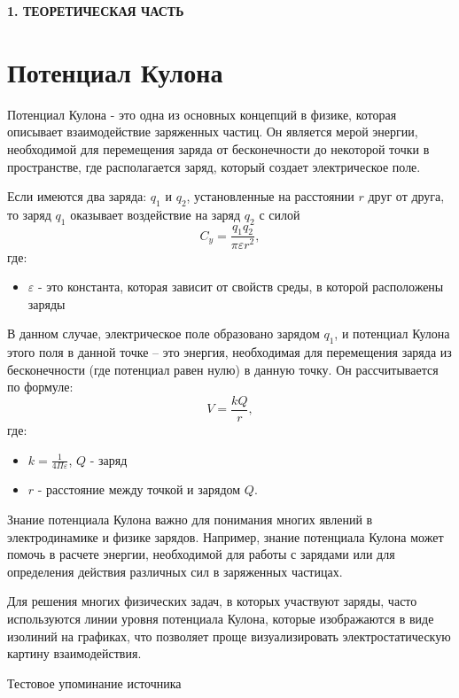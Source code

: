 \newpage
\begin{center}
  \textbf{\large 1. ТЕОРЕТИЧЕСКАЯ ЧАСТЬ}
\end{center}


\section{Потенциал Кулона}

Потенциал Кулона - это одна из основных концепций в физике, которая описывает взаимодействие заряженных частиц. Он является мерой энергии, необходимой для перемещения заряда от бесконечности до некоторой точки в пространстве, где располагается заряд, который создает электрическое поле.

Если имеются два заряда:  $q_1$ и $q_2$, установленные на расстоянии $r$ друг от друга, то заряд $q_1$ оказывает воздействие на заряд $q_2$ с силой 
\[ C_y= \frac{q_1 q_2}{\pi \varepsilon r^2}, \] 
где:
\begin{itemize}
	\item $\varepsilon$ - это константа, которая зависит от свойств среды, в которой расположены заряды
\end{itemize}

В данном случае, электрическое поле образовано зарядом $q_1$, и потенциал Кулона этого поля в данной точке – это энергия, необходимая для перемещения заряда из бесконечности (где потенциал равен нулю) в данную точку. Он рассчитывается по формуле: 
\[ V = \frac{k Q}{r}, \]
где:
\begin{itemize}
	\item $k = \frac{1}{4 \Pi \varepsilon}$, $Q$ - заряд
	\item $r$ - расстояние между точкой и зарядом $Q$.
\end{itemize}

Знание потенциала Кулона важно для понимания многих явлений в электродинамике и физике зарядов. Например, знание потенциала Кулона может помочь в расчете энергии, необходимой для работы с зарядами или для определения действия различных сил в заряженных частицах.

Для решения многих физических задач, в которых участвуют заряды, часто используются линии уровня потенциала Кулона, которые изображаются в виде изолиний на графиках, что позволяет проще визуализировать электростатическую картину взаимодействия.

Тестовое упоминание источника \cite{666.666}


